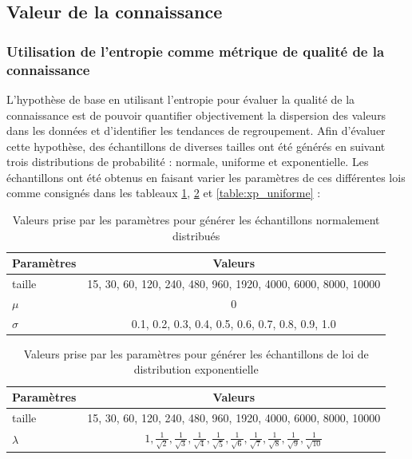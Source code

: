 \subsection{Valeur de la connaissance} \label{subsec:res_kg_value}

\subsubsection{Utilisation de l'entropie comme métrique de qualité de la connaissance} \label{subsubsec:res_entropie}
L'hypothèse de base en utilisant l'entropie pour évaluer la qualité de la connaissance est de pouvoir quantifier objectivement la dispersion des valeurs dans les données et d'identifier les tendances de regroupement. Afin d'évaluer cette hypothèse, des échantillons de diverses tailles ont été générés en suivant trois distributions de probabilité : normale, uniforme et exponentielle. Les échantillons ont été obtenus en faisant varier les paramètres de ces différentes lois comme consignés dans les tableaux \ref{table:xp_normale}, \ref{table:xp_exponentelle} et \ref{table:xp_uniforme} : 


\begin{table}[h]
\centering
\begin{tabular}{l c}
\toprule
Paramètres & Valeurs  \\
\midrule
taille & 15, 30, 60, 120, 240, 480, 960, 1920, 4000, 6000, 8000, 10000 \\
$\mu$ & 0 \\
$\sigma$ & 0.1, 0.2, 0.3, 0.4, 0.5, 0.6, 0.7, 0.8, 0.9, 1.0 \\
\bottomrule
\end{tabular}
\caption{Valeurs prise par les paramètres pour générer les échantillons normalement distribués } \label{table:xp_normale}
\end{table}


\begin{table}[h]
\centering
\begin{tabular}{l c}
\toprule
Paramètres & Valeurs  \\
\midrule
taille & 15, 30, 60, 120, 240, 480, 960, 1920, 4000, 6000, 8000, 10000 \\
$\lambda$ & $1, \frac{1}{\sqrt{2}}, \frac{1}{\sqrt{3}}, \frac{1}{\sqrt{4}}, \frac{1}{\sqrt{5}}, \frac{1}{\sqrt{6}}, \frac{1}{\sqrt{7}}, \frac{1}{\sqrt{8}}, \frac{1}{\sqrt{9}}, \frac{1}{\sqrt{10}}$ \\
\bottomrule
\end{tabular}
\caption{Valeurs prise par les paramètres pour générer les échantillons de loi de distribution exponentielle } \label{table:xp_exponentelle}
\end{table}


